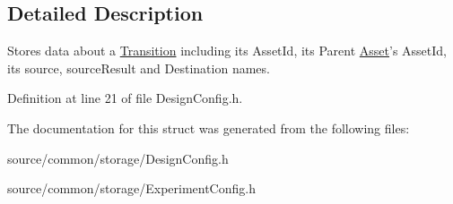 \subsection{Detailed Description}
Stores data about a \hyperlink{class_picto_1_1_transition}{Transition} including its Asset\-Id, its Parent \hyperlink{class_picto_1_1_asset}{Asset}'s Asset\-Id, its source, source\-Result and Destination names. 

Definition at line 21 of file Design\-Config.\-h.



The documentation for this struct was generated from the following files\-:\begin{DoxyCompactItemize}
\item 
source/common/storage/Design\-Config.\-h\item 
source/common/storage/Experiment\-Config.\-h\end{DoxyCompactItemize}
